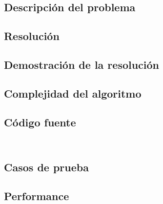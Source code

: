 \subsection{Descripci\'on del problema}


\subsection{Resoluci\'on}


\subsection{Demostraci\'on de la resoluci\'on}


\subsection{Complejidad del algoritmo}


\subsection{C\'odigo fuente}

\begin{lstlisting}


\end{lstlisting}

\subsection{Casos de prueba}

\subsection{Performance}

